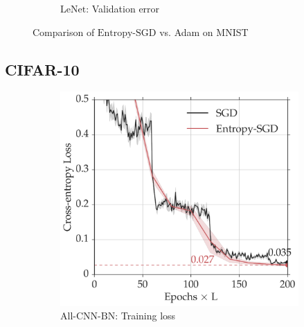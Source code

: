 \documentclass[10pt]{article}
\newcommand{\entropysgd}{\mathrm{Entropy}\textrm{-}\mathrm{SGD}}
\newcommand{\lenet}{\textrm{LeNet}}
\newcommand{\allcnn}{\textrm{All-CNN-BN}}
\begin{document}
\begin{figure}[htp!]
\begin{subfigure}[t]{0.4\textwidth}
        \caption{\small $\lenet$: Validation error}
        \label{fig:lenet_test}
    \end{subfigure}
\caption{\small Comparison of $\entropysgd$ vs. Adam on MNIST\vspace*{0.15in}}
\label{fig:mnist_test}
\end{figure}

\subsection{CIFAR-10}
\label{ss:expt:cifar}

\begin{figure}[htp!]
\centering
    \begin{subfigure}[b]{0.4\textwidth}
        \centering
        \includegraphics[width=\textwidth]{allcnn_loss.pdf}
        \caption{\small $\allcnn$: Training loss}
        \label{fig:allcnn_loss}
    \end{subfigure}
    \hspace{0.2in}
    \begin{subfigure}[b]{0.4\textwidth}
        \centering

\end{subfigure}
\end{figure}
\end{document}
